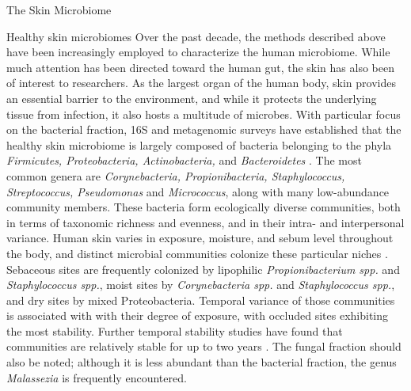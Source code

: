 \documentclass[oneside,12pt,final]{sty/ucthesis-CA2012}
\begin{document}
\begin{mainmatter}
\begin{section}{The Skin Microbiome}
\begin{subsection}{Healthy skin microbiomes}
Over the past decade, the methods described above have been increasingly employed to characterize the human microbiome. While much attention has been directed toward the human gut, the skin has also been of interest to researchers. As the largest organ of the human body, skin provides an essential barrier to the environment, and while it protects the underlying tissue from infection, it also hosts a multitude of microbes. With particular focus on the bacterial fraction, 16S and metagenomic surveys have established that the healthy skin microbiome is largely composed of bacteria belonging to the phyla \textit{Firmicutes, Proteobacteria, Actinobacteria,} and \textit{Bacteroidetes} \cite{RN165, RN36, RN72, RN166}. The most common genera are \textit{Corynebacteria, Propionibacteria, Staphylococcus, Streptococcus, Pseudomonas} and \textit{Micrococcus}, along with many low-abundance community members. These bacteria form ecologically diverse communities, both in terms of taxonomic richness and evenness, and in their intra- and interpersonal variance. Human skin varies in exposure, moisture, and sebum level throughout the body, and distinct microbial communities colonize these particular niches \cite{RN36}. Sebaceous sites are frequently colonized by lipophilic \textit{Propionibacterium spp.} and \textit{Staphylococcus spp.}, moist sites by \textit{Corynebacteria spp.} and \textit{Staphylococcus spp.}, and dry sites by mixed Proteobacteria. Temporal variance of those communities is associated with with their degree of exposure, with occluded sites exhibiting the most stability. Further temporal stability studies have found that communities are relatively stable for up to two years \cite{RN36, RN166}. The fungal fraction should also be noted; although it is less abundant than the bacterial fraction, the genus \textit{Malassezia} is frequently encountered.


\end{subsection}
\end{section}
\end{mainmatter}
\end{document}
